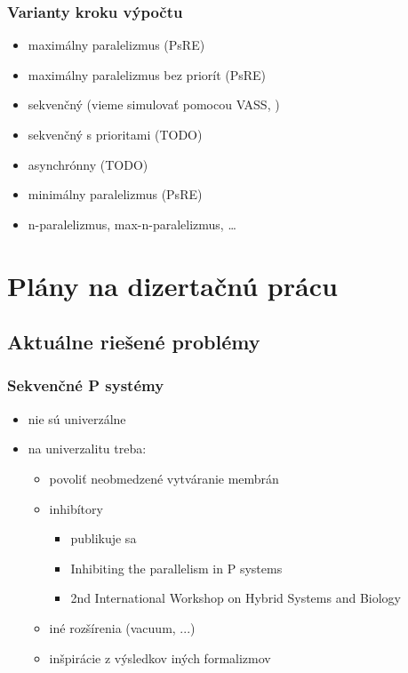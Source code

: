 \documentclass{beamer}
\begin{document}
\begin{frame}[t]\frametitle{Varianty kroku výpočtu}
\begin{itemize}
  \item maximálny paralelizmus (PsRE)
  \item maximálny paralelizmus bez priorít (PsRE) \cite{Sosik:2002:WithoutPriorities}
  \item sekvenčný (vieme simulovať pomocou VASS, \cite{Dang:2005:Sequential})
  \item sekvenčný s prioritami (TODO)
  \item asynchrónny (TODO)
  \item minimálny paralelizmus (PsRE) \cite{Ciobanu:2007:MinimalParallelism}
  \item n-paralelizmus, max-n-paralelizmus, \dots
\end{itemize}
\end{frame}



\section{Plány na dizertačnú prácu} %
\label{sec:plany_na_dizertacnu_pracu}

\subsection{Aktuálne riešené problémy} %
\label{sub:aktualne_riesene_problemy}

\begin{frame}[t]\frametitle{Sekvenčné P systémy}
\begin{itemize}
  \item nie sú univerzálne
  \item na univerzalitu treba:
  \begin{itemize}
    \item povoliť neobmedzené vytváranie membrán \cite{Dang:2005:Sequential}
    \item inhibítory
      \begin{itemize}
        \item publikuje sa
        \item Inhibiting the parallelism in P systems
        \item 2nd International Workshop on Hybrid Systems and Biology
      \end{itemize}
    \item iné rozšírenia (vacuum, ...)
    \item inšpirácie z výsledkov iných formalizmov
  \end{itemize}
\end{itemize}
\end{frame}
\end{document}
